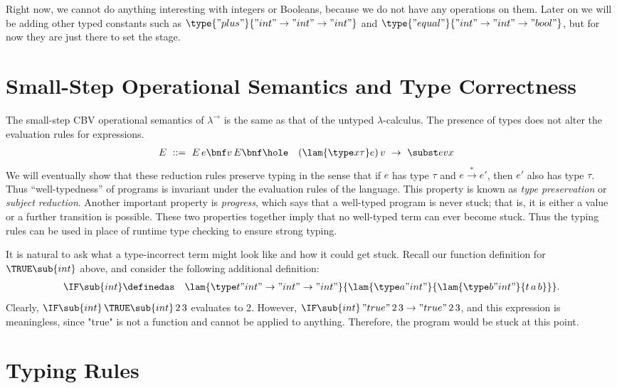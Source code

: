 Right now, we cannot do anything interesting with integers or Booleans, because we do not have any operations on them. Later on we will be adding other typed constants such as $\type{"plus"}{"int"\to"int"\to"int"}$ and $\type{"equal"}{"int"\to"int"\to"bool"}$, but for now they are just there to set the stage.

\section{Small-Step Operational Semantics and Type Correctness}

The small-step CBV operational semantics of $\lambda^\to$ is the same as that of the untyped $\lambda$-calculus. The presence of types does not alter the evaluation rules for expressions. 
\begin{align*}
E\ &::=\ E\,e \bnf v\,E \bnf \hole & (\lam{\type x\tau}e)\,v\ &\to\ \subst evx
\end{align*}
We will eventually show that these reduction rules preserve typing
in the sense that if $e$ has type $\tau$ and $e\stackrel*\to e'$,
then $e'$ also has type $\tau$.
Thus ``well-typedness'' of programs is invariant under the evaluation rules of the language.
This property is known as \emph{type preservation} or \emph{subject reduction}.
Another important property is \emph{progress}, which says that a well-typed program is never stuck;
that is, it is either a value or a further transition is possible.
These two properties together imply that no well-typed
term can ever become stuck. Thus the typing rules can be used
in place of runtime type checking to ensure strong typing.

It is natural to ask what a type-incorrect term
might look like and how it could get stuck.
Recall our function definition for
$\TRUE\sub{int}$ above, and consider the following additional
definition:
\begin{eqnarray*}
\IF\sub{int} &\definedas& \lam{\type t{"int" \to "int" \to "int"}}{\lam{\type a{"int"}}{\lam{\type b{"int"}}{t\,a\,b}}}.
\end{eqnarray*}
Clearly, $\IF\sub{int}\,\TRUE\sub{int}\,2\,3$ evaluates to 2.
However, $\IF\sub{int}\,"true"\,2\,3\to "true"\,2\,3$, and this
expression is meaningless, since "true" is not a function and cannot
be applied to anything. Therefore, the program would be stuck at this point.

\section{Typing Rules}

